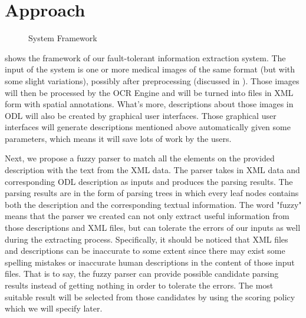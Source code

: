 \section{Approach}
\label{sec:appro}
%

\begin{figure}[th!]
\centering
{}
\caption{System Framework}
\label{fig:frame}
\end{figure}

 shows the framework of our fault-tolerant
information extraction system. The input of the system is
one or more medical images of the same format (but 
with some slight variations), possibly after preprocessing (discussed in
). Those images will then be processed by the OCR Engine and will be turned into files in XML form with spatial annotations. What's more, descriptions about those images in ODL will also be created by graphical user interfaces. Those graphical user interfaces will  generate descriptions mentioned above automatically given some parameters, which means it will save lots of work by the users.

 
Next, we propose a fuzzy parser to match all the elements on 
the provided description with the text from the XML data. The 
parser takes in XML data and corresponding ODL description as inputs 
and produces the parsing results. The parsing results are in the form of 
parsing trees in which every leaf nodes contains both the description and 
the corresponding textual information.
The word "fuzzy" means that the parser we created can not only extract useful information from those 
descriptions and XML files, but can tolerate the errors of our inputs as well during the extracting process. Specifically, it should be noticed that XML files and descriptions can be inaccurate to some extent since there may exist some spelling mistakes or inaccurate human descriptions in the content of those input files. That is to say, the fuzzy parser can provide possible candidate parsing results instead of getting nothing in order to tolerate the errors. The most suitable result will be selected from those candidates by using the scoring policy which we will specify later.    


